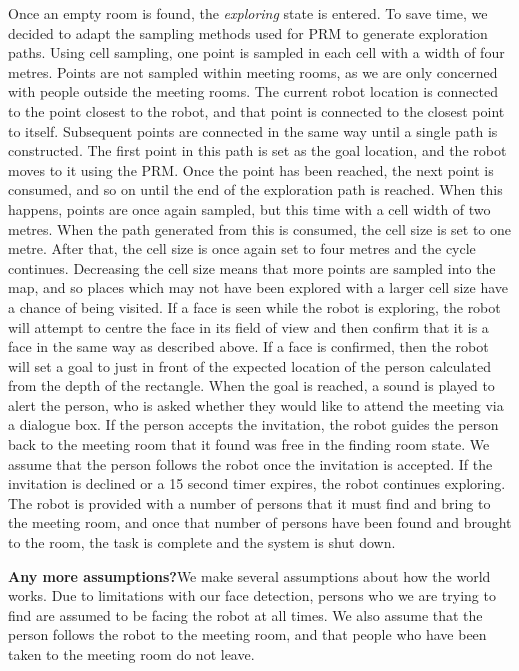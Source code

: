 \documentclass[conference]{IEEEtran}
\begin{document}
Once an empty room is found, the \emph{exploring} state is entered. To save time, we decided to adapt the sampling methods used for PRM to generate exploration paths. Using cell sampling, one point is sampled in each cell with a width of four metres. Points are not sampled within meeting rooms, as we are only concerned with people outside the meeting rooms. The current robot location is connected to the point closest to the robot, and that point is connected to the closest point to itself. Subsequent points are connected in the same way until a single path is constructed. The first point in this path is set as the goal location, and the robot moves to it using the PRM. Once the point has been reached, the next point is consumed, and so on until the end of the exploration path is reached. When this happens, points are once again sampled, but this time with a cell width of two metres. When the path generated from this is consumed, the cell size is set to one metre. After that, the cell size is once again set to four metres and the cycle continues. Decreasing the cell size means that more points are sampled into the map, and so places which may not have been explored with a larger cell size have a chance of being visited. If a face is seen while the robot is exploring, the robot will attempt to centre the face in its field of view and then confirm that it is a face in the same way as described above. If a face is confirmed, then the robot will set a goal to just in front of the expected location of the person calculated from the depth of the rectangle. When the goal is reached, a sound is played to alert the person, who is asked whether they would like to attend the meeting via a dialogue box. If the person accepts the invitation, the robot guides the person back to the meeting room that it found was free in the finding room state. We assume that the person follows the robot once the invitation is accepted. If the invitation is declined or a 15 second timer expires, the robot continues exploring. The robot is provided with a number of persons that it must find and bring to the meeting room, and once that number of persons have been found and brought to the room, the task is complete and the system is shut down.

\textbf{Any more assumptions?}We make several assumptions about how the world works. Due to limitations with our face detection, persons who we are trying to find are assumed to be facing the robot at all times. We also assume that the person follows the robot to the meeting room, and that people who have been taken to the meeting room do not leave.
\end{document}
